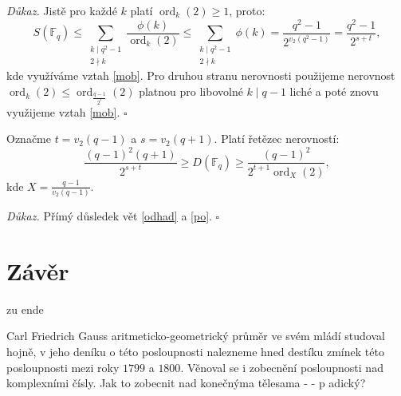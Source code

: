 \documentclass[12pt]{report}
\DeclareMathOperator{\ord}{ord}
\begin{document}
\noindent \textit{Důkaz.} Jistě pro každé $k$ platí $\ord_k (2) \geqslant 1$, proto:
$$S(\mathbb{F}_q) \leqslant \sum_{\substack{k \mid q^2-1 \\ 2 \nmid k}} \frac{\phi(k)}{\ord_k (2)} \leqslant \sum_{\substack{k \mid q^2-1 \\ 2 \nmid k}} \phi(k) = \frac{q^2-1}{2^{v_2(q^2-1)}} = \frac{q^2-1}{2^{s+t}},$$
kde využíváme vztah \eqref{mob}. Pro druhou stranu nerovnosti použijeme nerovnost $\ord_k(2) \leqslant \ord_{\frac{q-1}{2^{t}}}(2)$ platnou pro libovolné $k \mid q-1$ liché a poté znovu využijeme vztah \eqref{mob}. \hfill $\square$\\
 
\begin{dusledek}
Označme $t = v_2(q-1)$ a $s = v_2(q+1)$. Platí řetězec nerovností:
$$ \frac{(q-1)^2 (q+1)}{2^{s+t}} \geqslant D(\mathbb{F}_q) \geqslant  \frac{(q-1)^2}{2^{t+1} \ord_X ( 2 )},$$
kde $X = \frac{q-1}{v_2(q-1)}$.
\end{dusledek}
\noindent \textit{Důkaz.} Přímý důsledek vět \ref{odhad} a \ref{po}. \hfill $\square$\\





\chapter*{Závěr}
zu ende

Carl Friedrich Gauss aritmeticko-geometrický průměr ve svém mládí studoval hojně, v jeho deníku o této posloupnosti nalezneme hned destíku zmínek této posloupnosti mezi roky $1799$ a $1800$. Věnoval se i zobecnění posloupnosti nad komplexními čísly. Jak to zobecnit nad konečnýma tělesama - - p adický?





\end{document}
